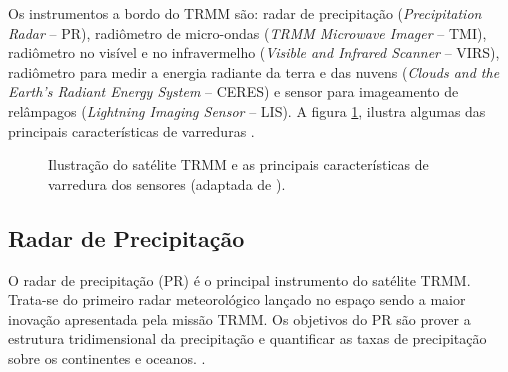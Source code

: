   
Os instrumentos a bordo do TRMM são: radar de precipitação (\textit{Precipitation Radar} -- PR), radiômetro de micro-ondas (\textit{TRMM Microwave Imager} -- TMI), radiômetro no visível e no infravermelho (\textit{Visible and Infrared Scanner} -- VIRS), radiômetro para medir a energia radiante da terra e das nuvens (\textit{Clouds and the Earth's Radiant Energy System} -- CERES) e sensor para imageamento de relâmpagos (\textit{Lightning Imaging Sensor} -- LIS). A figura \ref{figtrmm}, ilustra algumas das principais características de varreduras \cite{kummerok1998}.

\begin{figure}[!ht]
\caption{Ilustração do satélite TRMM e as  principais características de varredura dos sensores (adaptada de ).}
\label{figtrmm} 
\end{figure} 


\subsection{Radar de Precipitação}

O radar de precipitação (PR) é o principal instrumento do satélite TRMM. Trata-se do primeiro radar meteorológico lançado no espaço sendo a maior inovação apresentada pela missão TRMM. Os objetivos do PR são prover a estrutura tridimensional da precipitação e quantificar as taxas de precipitação sobre os continentes e oceanos.  \cite{kummerok1998}. 


